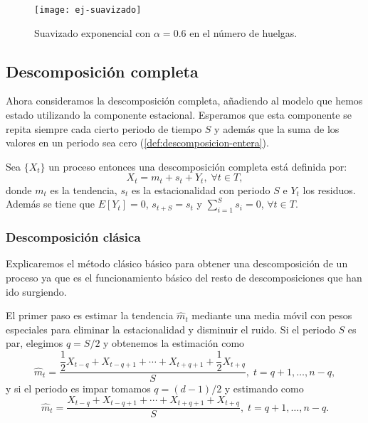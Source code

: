 \begin{figure}[htpb]
  \centering
  \texttt{[image: ej-suavizado]}
  \caption{Suavizado exponencial con $\alpha = 0.6$ en el número de huelgas.}
  \label{fig:ej-suavizado}
\end{figure}

\subsection{Descomposición completa}

Ahora consideramos la descomposición completa, añadiendo al modelo que hemos estado utilizando la componente estacional. Esperamos que esta componente se repita siempre cada cierto periodo de tiempo $S$ y además que la suma de los valores en un periodo sea cero (\autoref{def:descomposicion-entera}).

\begin{definicion}
  Sea $\{X_t\}$ un proceso entonces una descomposición completa está definida por:
  $$ X_t = m_t + s_t + Y_t, \; \forall t \in T,$$
  donde $m_t$ es la tendencia, $s_t$ es la estacionalidad con periodo $S$ e $Y_t$ los residuos.  Además se tiene que $E[Y_t] = 0$, $s_{t + S} = s_{t}$ y $\sum \limits^{S}_{i = 1} s_i = 0$, $\forall t \in T$.
  \label{def:descomposicion-entera}
\end{definicion}

\subsubsection{Descomposición clásica}

Explicaremos el método clásico básico para obtener una descomposición de un proceso ya que es el funcionamiento básico del resto de descomposiciones que han ido surgiendo.

El primer paso es estimar la tendencia $\hat{m}_t$ mediante una media móvil con pesos especiales para eliminar la estacionalidad y disminuir el ruido. Si el periodo $S$ es par, elegimos $q = S / 2$ y obtenemos la estimación como
\begin{equation*}
  \hat{m}_t = \dfrac{\dfrac{1}{2}X_{t - q} + X_{t-q+1} + \cdots + X_{t+q+1} + \dfrac{1}{2}X_{t + q}}{S}, \; t = q + 1, \ldots, n - q,
  \label{eq:decomp-1}
\end{equation*}
y si el periodo es impar tomamos $q = (d-1)/2$ y estimando como
\begin{equation*}
  \hat{m}_t = \dfrac{X_{t - q} + X_{t-q+1} + \cdots + X_{t+q+1} + X_{t + q}}{S}, \; t = q + 1, \ldots, n - q.
  \label{eq:decomp-2}
\end{equation*}

